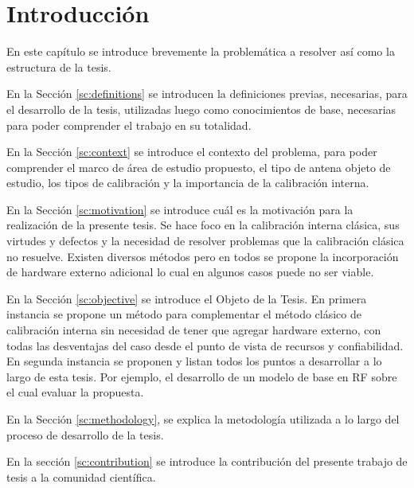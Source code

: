 
\chapter{Introducción} %

\label{ch:introduccion} %

En este capítulo se introduce brevemente la problemática a resolver así como la estructura de la tesis.

En la Sección \ref{sc:definitions} se introducen la definiciones previas, necesarias, para el desarrollo de la tesis, utilizadas
luego como conocimientos de base, necesarias para poder comprender el trabajo en su totalidad.

En la Sección \ref{sc:context} se introduce el contexto del problema, para poder comprender el marco de área de estudio
propuesto, el tipo de antena objeto de estudio, los tipos de calibración y la importancia de la calibración interna.

En la Sección \ref{sc:motivation} se introduce cuál es la motivación para la realización de la presente tesis. Se hace foco
en la calibración interna clásica, sus virtudes y defectos y la necesidad de resolver problemas que la calibración clásica no
resuelve. Existen diversos métodos pero en todos se propone la incorporación de hardware externo adicional lo cual en algunos 
casos puede no ser viable.

En la Sección \ref{sc:objective} se introduce el Objeto de la Tesis. En primera instancia se propone un método para 
complementar el método clásico de calibración interna sin necesidad de tener que agregar hardware externo, con todas las 
desventajas del caso desde el punto de vista de recursos y confiabilidad. En segunda instancia se proponen y listan todos los 
puntos a desarrollar a lo largo de esta tesis. Por ejemplo, el desarrollo de un modelo de base en RF sobre el cual evaluar la 
propuesta.

En la Sección \ref{sc:methodology}, se explica la metodología utilizada a lo largo del proceso de desarrollo de la tesis.

En la sección \ref{sc:contribution} se introduce la contribución del presente trabajo de tesis a la comunidad científica.

